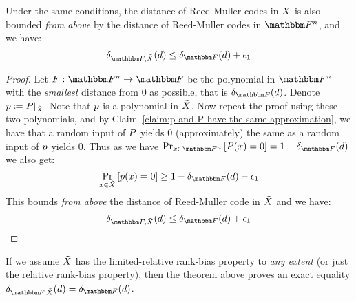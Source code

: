 \begin{remark}
    Under the same conditions,
    the distance of Reed-Muller codes in ${\tilde{X}}$ is also bounded \emph{from above} by the distance of Reed-Muller codes in $\field$,
    and we have:
    \[
        \normalizedcodedistanceex{\basefield}{\variety}{\degree} \leq \normalizedcodedistance{\basefield}{\degree} + \epsilon_1
    \]
    \begin{proof}
        Let $\funcdef{\genfunc}{\field}{\basefield}$ be the polynomial in $\field$ with the \emph{smallest} distance from $0$ as possible, that is $\normalizedcodedistance{\basefield}{\degree}$.
        Denote $\onvarpoly \definedas \restrictfunc{\genpoly}{\variety}$.
        Note that $\onvarpoly$ is a polynomial in ${\tilde{X}}$.
        Now repeat the proof using these two polynomials, and by Claim~\ref{claim:p-and-P-have-the-same-approximation}, we have that a random input of $\genpoly$ yields $0$
        (approximately) the same as a random input of $\onvarpoly$ yields $0$.
        Thus as we have $\prex{x \in \field}{\genpoly(x) = 0} = 1 - \normalizedcodedistance{\basefield}{\degree}$
        we also get:
        \[
            \prex{x \in \variety}{\onvarpoly(x) = 0} \geq 1 - \normalizedcodedistance{\basefield}{\degree} - \epsilon_1
        \]
        This bounds \emph{from above} the distance of Reed-Muller code in ${\tilde{X}}$ and we have:
        \[
            \normalizedcodedistanceex{\basefield}{\variety}{\degree} \leq \normalizedcodedistance{\basefield}{\degree} + \epsilon_1
        \]
    \end{proof}
\end{remark}
\begin{corollary}
    If we assume ${\tilde{X}}$ has the limited-relative rank-bias property to \emph{any extent} (or just the relative rank-bias property),
    then the theorem above proves an exact equality $\normalizedcodedistanceex{\basefield}{\variety}{\degree} = \normalizedcodedistance{\basefield}{\degree}$.
\end{corollary}
